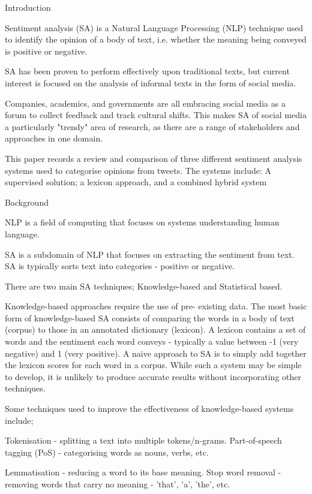 ﻿Introduction


Sentiment analysis (SA) is a Natural Language Processing (NLP)
technique used to identify the opinion of a
body of text, i.e. whether the meaning being conveyed is positive or negative.

SA has been proven to perform effectively upon traditional
texts, but current interest is focused on the analysis of informal texts in the form of social media.

Companies, academics, and governments are all embracing social media as a forum
to collect feedback and track cultural shifts. 
This makes SA of social media a particularly "trendy" area of
research, as there are a range of stakeholders and approaches in one domain.

This paper records a review and comparison of three different sentiment
analysis systems used to categorise opinions from tweets.
The systems include: A supervised solution; a lexicon approach,
and a combined hybrid system


Background


NLP is a field of computing that focuses on systems understanding human
language.  

SA is a subdomain of NLP that focuses on extracting the sentiment from text.
SA is typically sorts text into categories - positive or negative.

There are two main SA techniques;
Knowledge-based and Statistical based.

Knowledge-based approaches require the use of pre- existing data.
The most basic form of knowledge-based SA consists of
comparing the words in a body of text (corpus) to those in an annotated
dictionary (lexicon).
A lexicon contains a set of words and the sentiment each word conveys -
typically a value between -1 (very negative) and 1 (very positive).
A naive approach to SA is to simply add together the lexicon
scores for each word in a corpus.
While such a system may be simple to develop, it is unlikely to produce
accurate results without incorporating other techniques.

Some techniques used to improve the effectiveness of knowledge-based systems
include;

Tokenisation - splitting a text into multiple tokens/n-grams. 
Part-of-speech tagging (PoS) - categorising words as nouns, verbs, etc.

Lemmatisation - reducing a word to its base meaning.
Stop word removal - removing words that carry no meaning - 'that', 'a', 'the',
etc.

